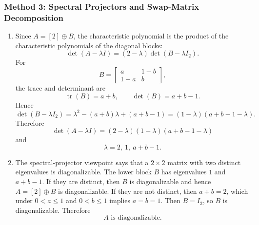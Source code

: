 \documentclass[12pt]{article}
\newcommand{\tr}{\operatorname{tr}}
\begin{document}
\subsubsection{Method 3: Spectral Projectors and Swap-Matrix Decomposition}
\begin{enumerate}[label=(\alph*)]
  \item Since $A=[2]\oplus B$, the characteristic polynomial is the product of the characteristic polynomials of the diagonal blocks:
  \[
  \det(A-\lambda I)=(2-\lambda)\det(B-\lambda I_2).
  \]
  For
  \[
  B=\begin{bmatrix}a&1-b\\1-a&b\end{bmatrix},
  \]
  the trace and determinant are
  \[
  \tr(B)=a+b,
  \qquad
  \det(B)=a+b-1.
  \]
  Hence
  \[
  \det(B-\lambda I_2)=\lambda^2-(a+b)\lambda+(a+b-1)=(1-\lambda)(a+b-1-\lambda).
  \]
  Therefore
  \[
  \boxed{\det(A-\lambda I)=(2-\lambda)(1-\lambda)(a+b-1-\lambda)}
  \]
  and
  \[
  \boxed{\lambda=2,\ 1,\ a+b-1.}
  \]

  \item The spectral-projector viewpoint says that a $2\times2$ matrix with two distinct eigenvalues is diagonalizable. The lower block $B$ has eigenvalues $1$ and $a+b-1$. If they are distinct, then $B$ is diagonalizable and hence $A=[2]\oplus B$ is diagonalizable. If they are not distinct, then $a+b=2$, which under $0<a\le1$ and $0<b\le1$ implies $a=b=1$. Then $B=I_2$, so $B$ is diagonalizable. Therefore
  \[
  \boxed{A\text{ is diagonalizable}.}
  \]


\end{enumerate}
\end{document}
